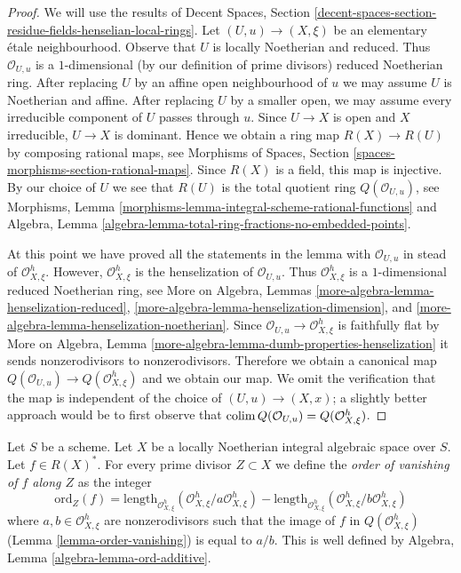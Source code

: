 \begin{proof}
We will use the results of Decent Spaces, Section
\ref{decent-spaces-section-residue-fields-henselian-local-rings}.
Let $(U, u) \to (X, \xi)$ be an elementary \'etale neighbourhood.
Observe that $U$ is locally Noetherian and reduced.
Thus $\mathcal{O}_{U, u}$ is a $1$-dimensional
(by our definition of prime divisors)
reduced Noetherian ring.
After replacing $U$ by an affine open neighbourhood of $u$
we may assume $U$ is Noetherian and affine.
After replacing $U$ by a smaller open, we may assume every irreducible
component of $U$ passes through $u$.
Since $U \to X$ is open and $X$ irreducible, $U \to X$ is dominant.
Hence we obtain a ring map $R(X) \to R(U)$ by composing rational maps, see
Morphisms of Spaces, Section \ref{spaces-morphisms-section-rational-maps}.
Since $R(X)$ is a field, this map is injective.
By our choice of $U$ we see that $R(U)$ is the total quotient
ring $Q(\mathcal{O}_{U, u})$, see
Morphisms, Lemma \ref{morphisms-lemma-integral-scheme-rational-functions}
and
Algebra, Lemma \ref{algebra-lemma-total-ring-fractions-no-embedded-points}.

\medskip\noindent
At this point we have proved all the statements in the lemma with
$\mathcal{O}_{U, u}$ in stead of $\mathcal{O}_{X, \xi}^h$.
However, $\mathcal{O}_{X, \xi}^h$ is the henselization of
$\mathcal{O}_{U, u}$. Thus $\mathcal{O}_{X, \xi}^h$ is a $1$-dimensional
reduced Noetherian ring, see
More on Algebra, Lemmas
\ref{more-algebra-lemma-henselization-reduced},
\ref{more-algebra-lemma-henselization-dimension}, and
\ref{more-algebra-lemma-henselization-noetherian}.
Since $\mathcal{O}_{U, u} \to \mathcal{O}_{X, \xi}^h$ is
faithfully flat by More on Algebra, Lemma
\ref{more-algebra-lemma-dumb-properties-henselization}
it sends nonzerodivisors to nonzerodivisors.
Therefore we obtain a canonical map
$Q(\mathcal{O}_{U, u}) \to Q(\mathcal{O}_{X, \xi}^h)$
and we obtain our map.
We omit the verification that the map is independent of
the choice of $(U, u) \to (X, x)$; a slightly better
approach would be to first observe that
$\mathop{\mathrm{colim}}\nolimits Q(\mathcal{O}_{U, u}) = Q(\mathcal{O}_{X, \xi}^h)$.
\end{proof}

\begin{definition}
\label{definition-order-vanishing}
Let $S$ be a scheme. Let $X$ be a locally Noetherian integral algebraic
space over $S$. Let $f \in R(X)^*$. For every prime divisor
$Z \subset X$ we define the {\it order of vanishing of $f$ along $Z$}
as the integer
$$
\text{ord}_Z(f) =
\text{length}_{\mathcal{O}_{X, \xi}^h}
(\mathcal{O}_{X, \xi}^h/a \mathcal{O}_{X, \xi}^h) -
\text{length}_{\mathcal{O}_{X, \xi}^h}
(\mathcal{O}_{X, \xi}^h/b \mathcal{O}_{X, \xi}^h)
$$
where $a, b \in \mathcal{O}_{X, \xi}^h$ are nonzerodivisors
such that the image of $f$ in $Q(\mathcal{O}_{X, \xi}^h)$
(Lemma \ref{lemma-order-vanishing}) is equal to $a/b$.
This is well defined by
Algebra, Lemma \ref{algebra-lemma-ord-additive}.
\end{definition}

